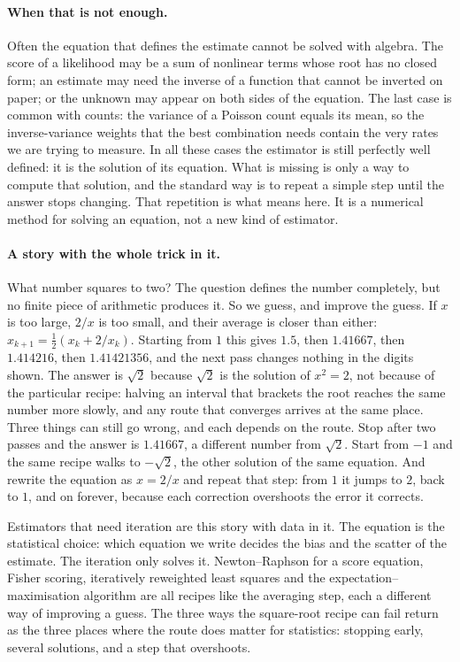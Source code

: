 \paragraph{When that is not enough.}
Often the equation that defines the estimate cannot be solved with algebra.
The score of a likelihood may be a sum of nonlinear terms whose root has no
closed form; an estimate may need the inverse of a function that cannot be
inverted on paper; or the unknown may appear on both sides of the equation.
The last case is common with counts: the variance of a Poisson count equals
its mean, so the inverse-variance weights that the best combination needs
contain the very rates we are trying to measure. In all these cases the
estimator is still perfectly well defined: it is the solution of its
equation. What is missing is only a way to compute that solution, and the
standard way is to repeat a simple step until the answer stops changing.
That repetition is what  means here. It is a numerical
method for solving an equation, not a new kind of estimator.

\paragraph{A story with the whole trick in it.}
What number squares to two? The question defines the number completely, but
no finite piece of arithmetic produces it. So we guess, and improve the
guess. If $x$ is too large, $2/x$ is too small, and their average is closer
than either: $x_{k+1}=\frac12(x_k+2/x_k)$. Starting from $1$ this gives
$1.5$, then $1.41667$, then $1.414216$, then $1.41421356$, and the next pass
changes nothing in the digits shown. The answer is $\sqrt2$ because $\sqrt2$
is the solution of $x^2=2$, not because of the particular recipe: halving an
interval that brackets the root reaches the same number more slowly, and any
route that converges arrives at the same place. Three things can still go
wrong, and each depends on the route. Stop after two passes and the answer is
$1.41667$, a different number from $\sqrt2$. Start from $-1$ and the same
recipe walks to $-\sqrt2$, the other solution of the same equation. And
rewrite the equation as $x=2/x$ and repeat that step: from $1$ it jumps to $2$,
back to $1$, and on forever, because each correction overshoots the error
it corrects.

Estimators that need iteration are this story with data in it. The
equation is the statistical choice: which equation we write decides the
bias and the scatter of the estimate. The iteration only solves it.
Newton--Raphson for a score equation, Fisher scoring, iteratively reweighted
least squares and the expectation--maximisation algorithm are all recipes
like the averaging step, each a different way of improving a guess. The three ways the
square-root recipe can fail return as the three places where the route does
matter for statistics: stopping early, several solutions, and a step that
overshoots.

